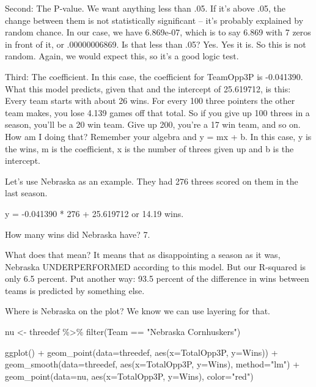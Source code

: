 \documentclass[
]{book}
\newenvironment{Shaded}{\begin{snugshade}}{\end{snugshade}}
\newcommand{\AttributeTok}[1]{\textcolor[rgb]{0.77,0.63,0.00}{#1}}
\newcommand{\FunctionTok}[1]{\textcolor[rgb]{0.00,0.00,0.00}{#1}}
\newcommand{\NormalTok}[1]{#1}
\newcommand{\OtherTok}[1]{\textcolor[rgb]{0.56,0.35,0.01}{#1}}
\newcommand{\SpecialCharTok}[1]{\textcolor[rgb]{0.00,0.00,0.00}{#1}}
\newcommand{\StringTok}[1]{\textcolor[rgb]{0.31,0.60,0.02}{#1}}
\begin{document}
Second: The P-value. We want anything less than .05. If it's above .05, the change between them is not statistically significant -- it's probably explained by random chance. In our case, we have 6.869e-07, which is to say 6.869 with 7 zeros in front of it, or .00000006869. Is that less than .05? Yes. Yes it is. So this is not random. Again, we would expect this, so it's a good logic test.

Third: The coefficient. In this case, the coefficient for TeamOpp3P is -0.041390. What this model predicts, given that and the intercept of 25.619712, is this: Every team starts with about 26 wins. For every 100 three pointers the other team makes, you lose 4.139 games off that total. So if you give up 100 threes in a season, you'll be a 20 win team. Give up 200, you're a 17 win team, and so on. How am I doing that? Remember your algebra and y = mx + b. In this case, y is the wins, m is the coefficient, x is the number of threes given up and b is the intercept.

Let's use Nebraska as an example. They had 276 threes scored on them in the last season.

y = -0.041390 * 276 + 25.619712 or 14.19 wins.

How many wins did Nebraska have? 7.

What does that mean? It means that as disappointing a season as it was, Nebraska UNDERPERFORMED according to this model. But our R-squared is only 6.5 percent. Put another way: 93.5 percent of the difference in wins between teams is predicted by something else.

Where is Nebraska on the plot? We know we can use layering for that.

\begin{Shaded}
\begin{Highlighting}[]
\NormalTok{nu }\OtherTok{\textless{}{-}}\NormalTok{ threedef }\SpecialCharTok{\%\textgreater{}\%} \FunctionTok{filter}\NormalTok{(Team }\SpecialCharTok{==} \StringTok{"Nebraska Cornhuskers"}\NormalTok{)}
\end{Highlighting}
\end{Shaded}

\begin{Shaded}
\begin{Highlighting}[]
\FunctionTok{ggplot}\NormalTok{() }\SpecialCharTok{+} 
  \FunctionTok{geom\_point}\NormalTok{(}\AttributeTok{data=}\NormalTok{threedef, }\FunctionTok{aes}\NormalTok{(}\AttributeTok{x=}\NormalTok{TotalOpp3P, }\AttributeTok{y=}\NormalTok{Wins)) }\SpecialCharTok{+}
  \FunctionTok{geom\_smooth}\NormalTok{(}\AttributeTok{data=}\NormalTok{threedef, }\FunctionTok{aes}\NormalTok{(}\AttributeTok{x=}\NormalTok{TotalOpp3P, }\AttributeTok{y=}\NormalTok{Wins), }\AttributeTok{method=}\StringTok{"lm"}\NormalTok{) }\SpecialCharTok{+}
  \FunctionTok{geom\_point}\NormalTok{(}\AttributeTok{data=}\NormalTok{nu, }\FunctionTok{aes}\NormalTok{(}\AttributeTok{x=}\NormalTok{TotalOpp3P, }\AttributeTok{y=}\NormalTok{Wins), }\AttributeTok{color=}\StringTok{"red"}\NormalTok{)}
\end{Highlighting}
\end{Shaded}
\end{document}
